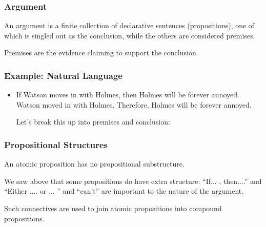 \documentclass{beamer}
\begin{document}

\begin{frame}
	\frametitle{Argument}
	
		An argument is a finite collection of declarative sentences (propositions), one of which is singled out as the conclusion, while the others are considered premises. 
		 
	\vspace{5mm}
	
	Premises are the evidence claiming to support the conclusion.	

	\vspace{40mm}

\end{frame}

\begin{frame}
	\frametitle{Example: Natural Language}
	
	\begin{itemize}
		\item If Watson moves in with Holmes, then Holmes will be forever annoyed. Watson moved in with Holmes. Therefore, Holmes will be forever annoyed.

		\vspace{5mm}

		Let's break this up into premises and conclusion: 
		
		\vspace{50mm}
		
		
	\end{itemize}
\end{frame}

\begin{frame}
	\frametitle{Propositional Structures}
	
	\begin{center} 
		
		An atomic proposition has no propositional substructure.
		
	\end{center}
	
	We saw above that some propositions do have extra structure: ``If... , then....'' and ``Either .... or ... '' and ``can't'' are important to the nature of the argument. 
	
	\vspace{5mm}
	
	Such connectives are used to join atomic propositions into compound propositions.
	
	\vspace{40mm}
\end{frame}
\end{document}
